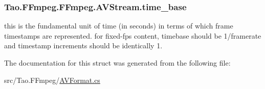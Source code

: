 \label{struct_tao_1_1_f_fmpeg_1_1_f_fmpeg_1_1_a_v_stream_a5ec28ddf1f03623fbfe486aaee65d5d4}
\hypertarget{struct_tao_1_1_f_fmpeg_1_1_f_fmpeg_1_1_a_v_stream_a83bf14c985f8a9712d60e20aa501708a}{
\subsubsection[{time\_\-base}]{ {\bf Tao.FFmpeg.FFmpeg.AVStream.time\_\-base}}}
\label{struct_tao_1_1_f_fmpeg_1_1_f_fmpeg_1_1_a_v_stream_a83bf14c985f8a9712d60e20aa501708a}
this is the fundamental unit of time (in seconds) in terms of which frame timestamps are represented. for fixed-\/fps content, timebase should be 1/framerate and timestamp increments should be identically 1. 

The documentation for this struct was generated from the following file:\begin{DoxyCompactItemize}
\item 
src/Tao.FFmpeg/\hyperlink{_a_v_format_8cs}{AVFormat.cs}\end{DoxyCompactItemize}
